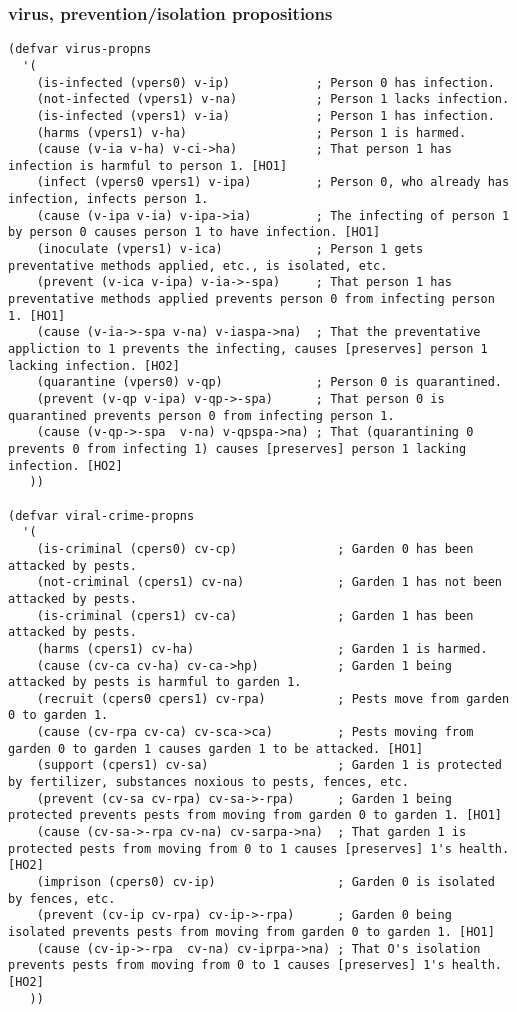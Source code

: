 \documentclass[12pt,xcolor=svgnames]{beamer}
\begin{document}
\begin{frame}[fragile]\frametitle{virus, prevention/isolation propositions}
\vspace{-1.5ex}
\begin{lstlisting}
(defvar virus-propns
  '(
    (is-infected (vpers0) v-ip)            ; Person 0 has infection.
    (not-infected (vpers1) v-na)           ; Person 1 lacks infection.
    (is-infected (vpers1) v-ia)            ; Person 1 has infection.
    (harms (vpers1) v-ha)                  ; Person 1 is harmed.
    (cause (v-ia v-ha) v-ci->ha)           ; That person 1 has infection is harmful to person 1. [HO1]
    (infect (vpers0 vpers1) v-ipa)         ; Person 0, who already has infection, infects person 1.
    (cause (v-ipa v-ia) v-ipa->ia)         ; The infecting of person 1 by person 0 causes person 1 to have infection. [HO1]
    (inoculate (vpers1) v-ica)             ; Person 1 gets preventative methods applied, etc., is isolated, etc.
    (prevent (v-ica v-ipa) v-ia->-spa)     ; That person 1 has preventative methods applied prevents person 0 from infecting person 1. [HO1]
    (cause (v-ia->-spa v-na) v-iaspa->na)  ; That the preventative appliction to 1 prevents the infecting, causes [preserves] person 1 lacking infection. [HO2]
    (quarantine (vpers0) v-qp)             ; Person 0 is quarantined.
    (prevent (v-qp v-ipa) v-qp->-spa)      ; That person 0 is quarantined prevents person 0 from infecting person 1.
    (cause (v-qp->-spa  v-na) v-qpspa->na) ; That (quarantining 0 prevents 0 from infecting 1) causes [preserves] person 1 lacking infection. [HO2]
   ))

(defvar viral-crime-propns
  '(
    (is-criminal (cpers0) cv-cp)              ; Garden 0 has been attacked by pests.
    (not-criminal (cpers1) cv-na)             ; Garden 1 has not been attacked by pests.
    (is-criminal (cpers1) cv-ca)              ; Garden 1 has been attacked by pests.
    (harms (cpers1) cv-ha)                    ; Garden 1 is harmed.
    (cause (cv-ca cv-ha) cv-ca->hp)           ; Garden 1 being attacked by pests is harmful to garden 1.
    (recruit (cpers0 cpers1) cv-rpa)          ; Pests move from garden 0 to garden 1.
    (cause (cv-rpa cv-ca) cv-sca->ca)         ; Pests moving from garden 0 to garden 1 causes garden 1 to be attacked. [HO1]
    (support (cpers1) cv-sa)                  ; Garden 1 is protected by fertilizer, substances noxious to pests, fences, etc.
    (prevent (cv-sa cv-rpa) cv-sa->-rpa)      ; Garden 1 being protected prevents pests from moving from garden 0 to garden 1. [HO1]
    (cause (cv-sa->-rpa cv-na) cv-sarpa->na)  ; That garden 1 is protected pests from moving from 0 to 1 causes [preserves] 1's health. [HO2]
    (imprison (cpers0) cv-ip)                 ; Garden 0 is isolated by fences, etc.
    (prevent (cv-ip cv-rpa) cv-ip->-rpa)      ; Garden 0 being isolated prevents pests from moving from garden 0 to garden 1. [HO1]
    (cause (cv-ip->-rpa  cv-na) cv-iprpa->na) ; That O's isolation prevents pests from moving from 0 to 1 causes [preserves] 1's health. [HO2]
   ))

\end{lstlisting}
\end{frame}
\end{document}
